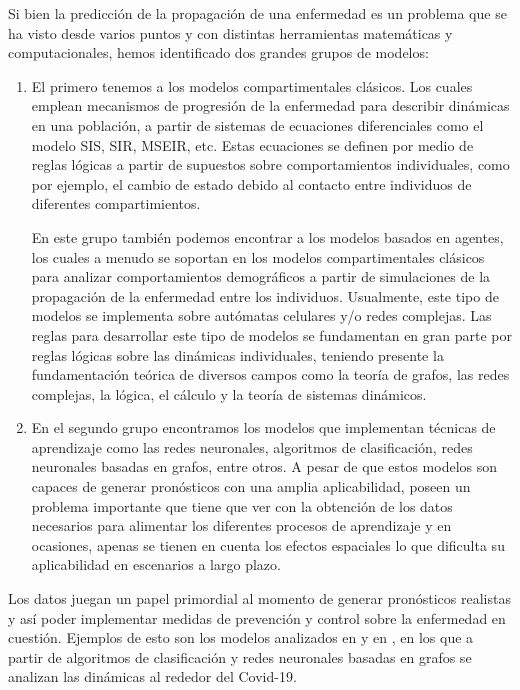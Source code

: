 Si bien la predicción de la propagación de una enfermedad es un problema que se ha visto desde varios puntos y con distintas herramientas matemáticas y computacionales, hemos identificado dos grandes grupos de modelos: 
\begin{enumerate}
    \item El primero tenemos a los modelos compartimentales clásicos. Los cuales emplean mecanismos de progresión de la enfermedad para describir dinámicas en una población, a partir de sistemas de ecuaciones diferenciales como el modelo SIS, SIR, MSEIR, etc. Estas ecuaciones se definen por medio de reglas lógicas a partir de supuestos sobre comportamientos individuales, como por ejemplo, el cambio de estado debido al contacto entre individuos de diferentes compartimientos.
    
    En este grupo también podemos encontrar a los modelos basados en agentes, los cuales a menudo se soportan en los modelos compartimentales clásicos para analizar comportamientos demográficos a partir de simulaciones de la propagación de la enfermedad entre los individuos. Usualmente, este tipo de modelos se implementa sobre autómatas celulares y/o redes complejas. Las reglas para desarrollar este tipo de modelos se fundamentan en gran parte por reglas lógicas sobre las dinámicas individuales, teniendo presente la fundamentación teórica de diversos campos como la teoría de grafos, las redes complejas, la lógica, el cálculo y la teoría de sistemas dinámicos.
    \item En el segundo grupo encontramos los modelos que implementan técnicas de aprendizaje como las redes neuronales, algoritmos de clasificación, redes neuronales basadas en grafos, entre otros. A pesar de que estos modelos son capaces de generar pronósticos con una amplia aplicabilidad, poseen un problema importante que tiene que ver con la obtención de los datos necesarios para alimentar los diferentes procesos de aprendizaje y en ocasiones, apenas se tienen en cuenta los efectos espaciales lo que dificulta su aplicabilidad en escenarios a largo plazo.
\end{enumerate}

Los datos juegan un papel primordial al momento de generar pronósticos realistas y así poder implementar medidas de prevención y control sobre la enfermedad en cuestión. Ejemplos de esto son los modelos analizados en \cite{epidemiologicalNeuralNetwork, combiningGraph, forecasting} y en \cite{transfer2021}, en los que a partir de algoritmos de clasificación y redes neuronales basadas en grafos se analizan las dinámicas al rededor del Covid-19.

